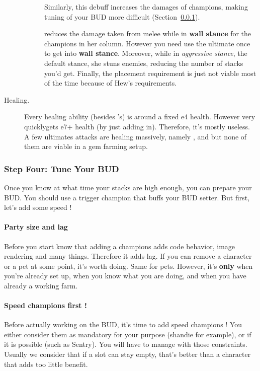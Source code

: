 \documentclass{article}
\begin{document}
\begin{description}
\begin{description}
    Similarly, this debuff increases the damages of champions, making tuning of your BUD more difficult (Section~\ref{sec:stepFour}).
    \item[\selise] 
    \selise reduces the damage taken from melee while in \textbf{wall stance} for the champions in her column.
    However you need use the ultimate once to get into \textbf{wall stance}.
    Moreover, while in \textit{aggressive stance}, the default stance, she stuns enemies, reducing the number of stacks you'd get.
    Finally, the placement requirement is just not viable most of the time because of Hew's requirements.
    \end{description}
    \item[Healing.]
    Every healing ability (besides \briv's) is around a fixed e4 health.
    However very quickly\briv gets e7+ health (by just adding \dragonbait in).
    Therefore, it's mostly useless.
    A few ultimates attacks are healing massively, namely \celeste, \widdle and \walnut but none of them are viable in a gem farming setup.
\end{description}



\subsubsection{Step Four: Tune Your BUD}
\label{sec:stepFour}

Once you know at what time your stacks are high enough, you can prepare your BUD.
You should use a trigger champion that buffs your BUD setter.
But first, let's add some speed !

\paragraph{Party size and lag}

Before you start know that adding a champions adds code behavior, image rendering and many things.
Therefore it adds lag.
If you can remove a character or a pet at some point, it's worth doing.
Same for pets.
However, it's \textbf{only} when you're already set up, when you know what you are doing, and when you have already a working farm.

\paragraph{Speed champions first !}

Before actually working on the BUD, it's time to add speed champions !
You either consider them as mandatory for your purpose (shandie for example), or if it is possible (such as Sentry).
You will have to manage with those constraints.
Usually we consider that if a slot can stay empty, that's better than a character that adds too little benefit.
\end{document}
